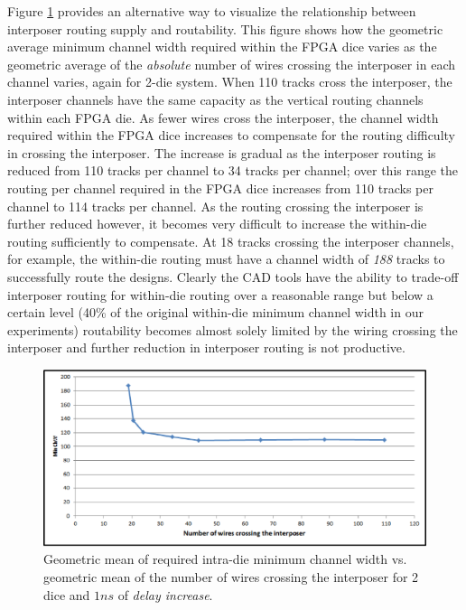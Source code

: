 \documentclass{sig-alternate-2013}
\begin{document}
Figure \ref{fig:crossingwires} provides an alternative way to visualize the relationship between interposer routing supply and routability. This figure shows how the geometric average minimum channel width required within the FPGA dice varies as the geometric average of the \emph{absolute} number of wires crossing the interposer in each channel varies, again for 2-die system. When 110 tracks cross the interposer, the interposer channels have the same capacity as the vertical routing channels within each FPGA die. As fewer wires cross the interposer, the channel width required within the FPGA dice increases to compensate for the routing difficulty in crossing the interposer. The increase is gradual as the interposer routing is reduced from 110 tracks per channel to 34 tracks per channel; over this range the routing per channel required in the FPGA dice increases from 110 tracks per channel to 114 tracks per channel. As the routing crossing the interposer is further reduced however, it becomes very difficult to increase the within-die routing sufficiently to compensate. At 18 tracks crossing the interposer channels, for example, the within-die routing must have a channel width of \emph{188} tracks to successfully route the designs. Clearly the CAD tools have the ability to trade-off interposer routing for within-die routing over a reasonable range but below a certain level (40\% of the original within-die minimum channel width in our experiments) routability becomes almost solely limited by the wiring crossing the interposer and further reduction in interposer routing is not productive.

\begin{figure}[!htbp]
\centering
\includegraphics[width=\linewidth]{numberofcrossingwires_new.eps}
\caption{Geometric mean of required intra-die minimum channel width vs. geometric mean of the number of wires crossing the interposer for 2 dice and $1ns$ of \textit{delay increase}.}
\label{fig:crossingwires}
\end{figure}
\end{document}
